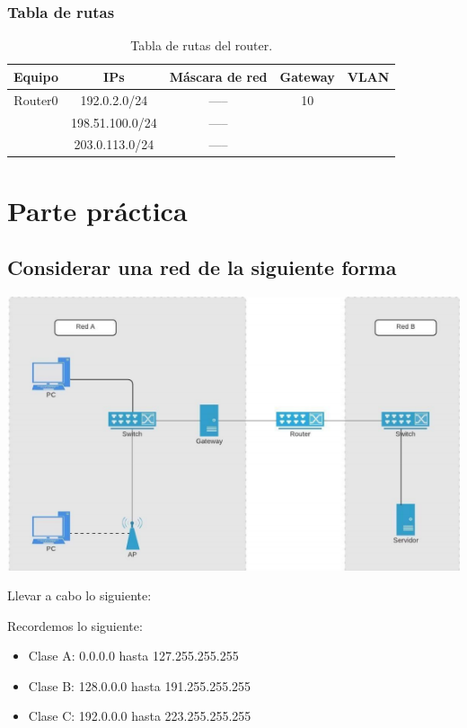 \documentclass[spanish,12pt,letterpaper]{article}
\begin{document}
\subsubsection{Tabla de rutas}


\begin{table}[H]
  \centering
  \begin{tabular}{| c | c | c | c | c |}\hline
    Equipo & IPs & Máscara de red & Gateway & VLAN \\ \hline
    Router0 & 192.0.2.0/24 & ----- & 10 & \\
    & 198.51.100.0/24 & ----- &  & \\
    & 203.0.113.0/24 & ----- &  & \\\hline
  \end{tabular}
  \caption{Tabla de rutas del router.}
\end{table}
\section{Parte práctica}
\subsection{Considerar una red de la siguiente forma}
\begin{center}
  \includegraphics[scale=.75]{red.png}
\end{center}
Llevar a cabo lo siguiente:

  Recordemos lo siguiente:
  \begin{itemize}
  \item Clase A: 0.0.0.0 hasta 127.255.255.255
  \item Clase B: 128.0.0.0 hasta 191.255.255.255
  \item Clase C: 192.0.0.0 hasta 223.255.255.255
  \end{itemize}
  
\end{document}
